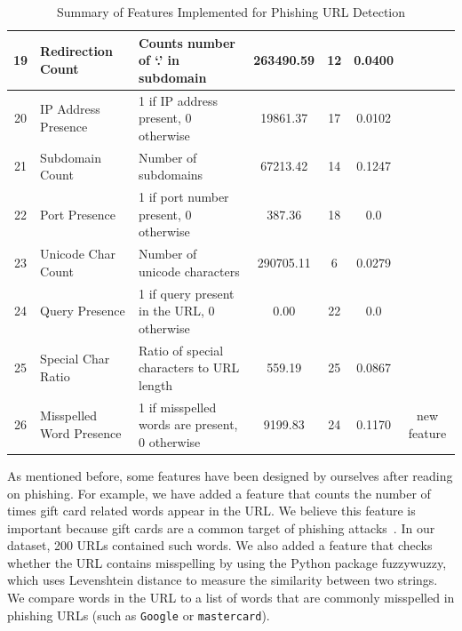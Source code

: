 \documentclass{article}
\begin{document}
\begin{table}[H]
\begin{adjustwidth}{-3cm}{}
\begin{tabular}{|c|p{4cm}|p{5cm}|c|c|c|c|}
                19           & Redirection Count               & Counts number of `.' in subdomain              & 263490.59          & 12                   & 0.0400                   &                                             \\ \hline
                20           & IP Address Presence             & 1 if IP address present, 0 otherwise           & 19861.37           & 17                   & 0.0102                   & ~\cite{PhishSafe,LexicalFeatureSelection}   \\ \hline
                21           & Subdomain Count                 & Number of subdomains                           & 67213.42           & 14                   & 0.1247                   & ~\cite{PhishSafe}                           \\ \hline
                22           & Port Presence                   & 1 if port number present, 0 otherwise          & 387.36             & 18                   & 0.0                      & ~\cite{LexicalFeatureSelection}             \\ \hline
                23           & Unicode Char Count              & Number of unicode characters                   & 290705.11          & 6                    & 0.0279                   & ~\cite{LexicalFeatureSelection}             \\ \hline
                24           & Query Presence                  & 1 if query present in the URL, 0 otherwise     & 0.00               & 22                   & 0.0                      & ~\cite{LexicalFeatureSelection}             \\ \hline
                25           & Special Char Ratio              & Ratio of special characters to URL length      & 559.19             & 25                   & 0.0867                   & \cite{PhishingLoginURLDetection} \\ \hline
                26           & Misspelled Word Presence        & 1 if misspelled words are present, 0 otherwise & 9199.83 & 24 & 0.1170 & new feature \\ \hline
            \end{tabular}
            \caption{Summary of Features Implemented for Phishing URL Detection}
            \label{tab:features}
        \end{adjustwidth}
    \end{table}

    As mentioned before, some features have been designed by ourselves after reading on phishing.
    For example, we have added a feature that counts the number of times gift card related words appear in the URL.
    We believe this feature is important because gift cards are a common target of phishing attacks~\cite{PhishingActivityTrendsReport}.
    In our dataset, 200 URLs contained such words.
    We also added a feature that checks whether the URL contains misspelling by using the Python package fuzzywuzzy, which uses Levenshtein distance to measure the similarity between two strings.
    We compare words in the URL to a list of words that are commonly misspelled in phishing URLs (such as \texttt{Google} or \texttt{mastercard}).
\end{document}
